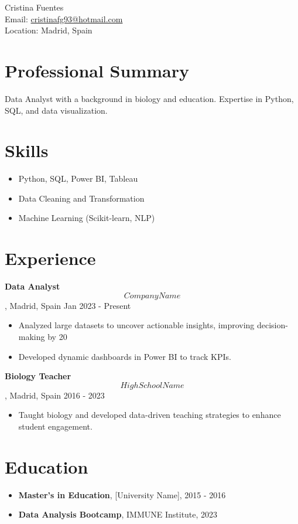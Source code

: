 \documentclass[11pt]{article}
\begin{document}
\begin{center}
    {\LARGE Cristina Fuentes} \\
    Email: \href{mailto:cristinafg93@hotmail.com}{cristinafg93@hotmail.com} \\
    Location: Madrid, Spain
\end{center}

\section*{Professional Summary}
Data Analyst with a background in biology and education. Expertise in Python, SQL, and data visualization.

\section*{Skills}
\begin{itemize}[leftmargin=*]
    \item Python, SQL, Power BI, Tableau
    \item Data Cleaning and Transformation
    \item Machine Learning (Scikit-learn, NLP)
\end{itemize}

\section*{Experience}
\textbf{Data Analyst} \\
\[Company Name\], Madrid, Spain \hfill Jan 2023 - Present
\begin{itemize}[leftmargin=*]
    \item Analyzed large datasets to uncover actionable insights, improving decision-making by 20%
    \item Developed dynamic dashboards in Power BI to track KPIs.
\end{itemize}

\textbf{Biology Teacher} \\
\[High School Name\], Madrid, Spain \hfill 2016 - 2023
\begin{itemize}[leftmargin=*]
    \item Taught biology and developed data-driven teaching strategies to enhance student engagement.
\end{itemize}

\section*{Education}
\begin{itemize}[leftmargin=*]
    \item \textbf{Master's in Education}, [University Name], 2015 - 2016
    \item \textbf{Data Analysis Bootcamp}, IMMUNE Institute, 2023
\end{itemize}
\end{document}
